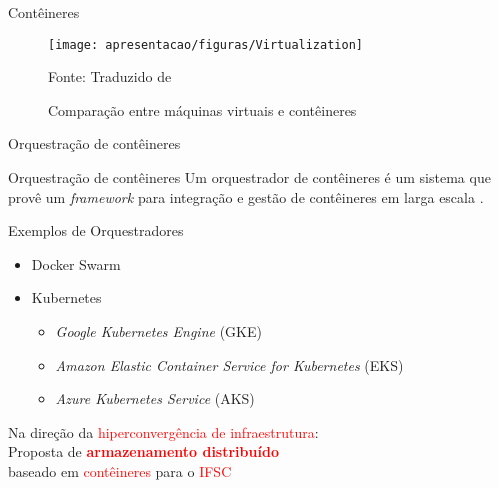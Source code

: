\documentclass{beamer}
\begin{document}

\begin{frame}{Contêineres}
    \begin{figure}[!htpb]
    	\centering
    	\caption{Comparação entre máquinas virtuais e contêineres}
        \texttt{[image: apresentacao/figuras/Virtualization]}
        
    	Fonte: Traduzido de \cite{paascontainer}
     	\label{virtualization_layers}
    \end{figure}
\end{frame}


\begin{frame}{Orquestração de contêineres}
    \begin{block}{Orquestração de contêineres}
        Um orquestrador de contêineres é um sistema que provê um \textit{framework} para integração e gestão de contêineres em larga escala \cite{containerOrchestration}.
    \end{block}
    
    \begin{block}{Exemplos de Orquestradores}
    \begin{itemize}
        \item Docker Swarm
        \item Kubernetes
        \begin{itemize}
            \item \textit{Google Kubernetes Engine} (GKE)
            \item \textit{Amazon Elastic Container Service for Kubernetes} (EKS)
            \item \textit{Azure Kubernetes Service} (AKS)
        \end{itemize}
    \end{itemize}
    \end{block}
\end{frame}


\begin{frame}
    \centering
    \Large{Na direção da \textcolor{red}{hiperconvergência de infraestrutura}:
    \\Proposta de \textbf{\textcolor{red}{armazenamento distribuído}}
    \\baseado em \textcolor{red}{contêineres} para o \textcolor{red}{IFSC}}
    \break
\end{frame}
\end{document}
